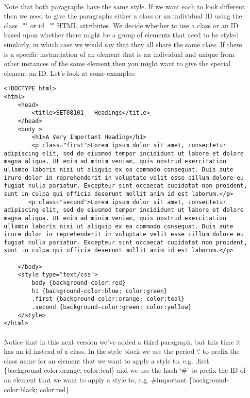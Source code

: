 \documentclass[10pt, a4paper, twosize]{article}
\begin{document}
\paragraph{} Note that both paragraphs have the same style. If we want each to look different then we need to give the paragraphs either a class or an individual ID using the class="" or id="" HTML attributes. We decide whether to use a class or an ID based upon whether there might be a group of elements that need to be styled similarly, in which case we would say that they all share the same class. If there is a specific instantiation of an element that is an individual and unique from other instances of the same element then you might want to give the special element an ID. Let's look at some examples:

\begin{lstlisting}
<!DOCTYPE html>
<html>
    <head>
        <title>SET08101 - Headings</title>
    </head>
    <body >
        <h1>A Very Important Heading</h1>
        <p class="first">Lorem ipsum dolor sit amet, consectetur adipiscing elit, sed do eiusmod tempor incididunt ut labore et dolore magna aliqua. Ut enim ad minim veniam, quis nostrud exercitation ullamco laboris nisi ut aliquip ex ea commodo consequat. Duis aute irure dolor in reprehenderit in voluptate velit esse cillum dolore eu fugiat nulla pariatur. Excepteur sint occaecat cupidatat non proident, sunt in culpa qui officia deserunt mollit anim id est laborum.</p>
       <p class="second">Lorem ipsum dolor sit amet, consectetur adipiscing elit, sed do eiusmod tempor incididunt ut labore et dolore magna aliqua. Ut enim ad minim veniam, quis nostrud exercitation ullamco laboris nisi ut aliquip ex ea commodo consequat. Duis aute irure dolor in reprehenderit in voluptate velit esse cillum dolore eu fugiat nulla pariatur. Excepteur sint occaecat cupidatat non proident, sunt in culpa qui officia deserunt mollit anim id est laborum.</p>

    </body>
    <style type="text/css">
        body {background-color:red}
        h1 {background-color:blue; color:green}
        .first {background-color:orange; color:teal}
        .second {background-color:green; color:yellow}
    </style>
</html>
\end{lstlisting}

\paragraph{} Notice that in this next version we've added a third paragraph, but this time it has an id instead of a class. In the style block we use the period `.' to prefix the class name for an element that we want to apply a style to, e.g. .first \{background-color:orange; color:teal\} and we use the hash `\#' to prefix the ID of an element that we want to apply a style to, e.g. \#important \{background-color:black; color:red\}
\end{document}
